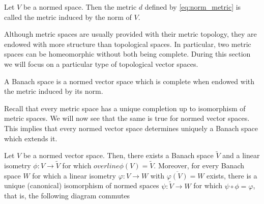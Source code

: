 \begin{definition}
	Let $V$ be a normed space. Then the metric $d$ defined by \eqref{eq:norm_metric} is called the metric induced by the norm of $V$.
\end{definition}

Although metric spaces are usually provided with their metric topology, they are endowed with more structure than topological spaces. In particular, two metric spaces can be homeomorphic without both being complete. During this section we will focus on a particular type of topological vector spaces.

\begin{definition}
	A Banach space is a normed vector space which is complete when endowed with the metric induced by its norm.
\end{definition}

Recall that every metric space has a unique completion up to isomorphism of metric spaces. We will now see that the same is true for normed vector spaces. This implies that every normed vector space determines uniquely a Banach space which extends it.

\begin{theorem}
	Let $V$ be a normed vector space. Then, there exists a Banach space $\tilde{V}$ and a linear isometry $\phi:V\rightarrow\tilde{V}$ for which $overline{\phi(V)}=\tilde{V}$. Moreover, for every Banach space $W$ for which a linear isometry $\varphi:V\rightarrow W$ with $\overline{\varphi(V)}=W$ exists, there is a unique (canonical) isomorphism of normed spaces $\psi:\tilde{V}\rightarrow W$ for which $\psi\circ\phi=\varphi$, that is, the following diagram commutes
	
	\begin{center}
	\end{center}
\end{theorem}

